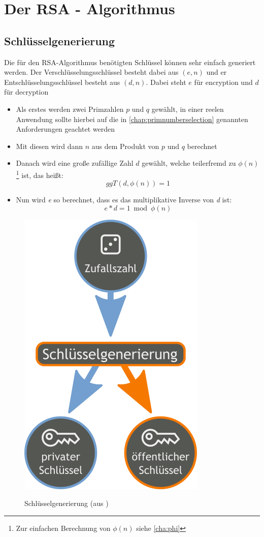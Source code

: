 \documentclass[12pt,a4paper]{scrartcl}
\begin{document}
	
\pagebreak
\section{Der RSA - Algorithmus}
		
	\subsection{Schlüsselgenerierung}
Die für den RSA-Algorithmus benötigten Schlüssel können sehr einfach generiert werden. Der Verschlüsselungsschlüssel besteht dabei aus $(e, n)$ und er Entschlüsselungsschlüssel besteht aus $(d, n)$. Dabei steht $e$ für encryption und $d$ für decryption 
\begin{itemize}
\item Als erstes werden zwei Primzahlen $p$ und $q$ gewählt, in einer reelen Anwendung sollte hierbei auf die in \ref{chap:primnumberselection} genannten Anforderungen geachtet werden  
\item Mit diesen wird dann $n$ aus dem Produkt von $p$ und $q$ berechnet
\item Danach wird eine große zufällige Zahl $d$ gewählt, welche teilerfremd zu ${\phi(n)}$\footnote{Zur einfachen Berechnung von ${\phi(n)}$ siehe \ref{cha:phi}} ist, das heißt:
$${ggT(d, \phi(n)) = 1}$$ 
\item Nun wird \textit{e} so berechnet, dass es das multiplikative Inverse von \textit{d} ist:
$${e * d = 1 \bmod \phi(n)}$$
\end{itemize}

\begin{figure}
\includegraphics[scale=0.3]{Orange_blue_public_private_keygeneration} \\
\caption{Schlüsselgenerierung (aus \cite{wikipedia})}
\label{fig:figure1}
\end{figure}
\end{document}
